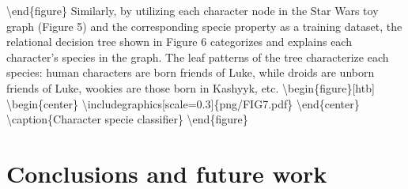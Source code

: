 \documentclass{article}%
\begin{document}
\newline%
\textbackslash{}end\{figure\}\newline%
\newline%
Similarly, by utilizing each character node in the Star Wars toy graph (Figure 5) and the corresponding specie property as a training dataset, the relational decision tree shown in Figure 6 categorizes and explains each character's species in the graph. The leaf patterns of the tree characterize each species: human characters are born friends of Luke, while droids are unborn friends of Luke, wookies are those born in Kashyyk, etc.\newline%
\newline%
\textbackslash{}begin\{figure\}{[}htb{]}\newline%
\textbackslash{}begin\{center\}\newline%
\textbackslash{}includegraphics{[}scale=0.3{]}\{png/FIG7.pdf\}\newline%
\textbackslash{}end\{center\}\newline%
\textbackslash{}caption\{Character specie classifier\}\newline%
\newline%
\textbackslash{}end\{figure\}

%
\clearpage%
\section{Conclusions and future work}%
\label{sec:Conclusionsandfuturework}%
\end{document}
